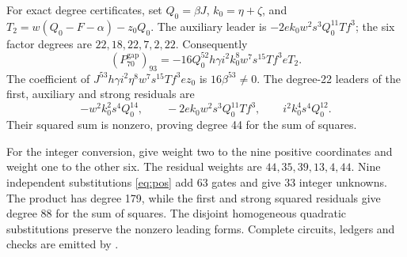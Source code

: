For exact degree certificates, set \(Q_0=\beta J\),
\(k_0=\eta+\zeta\), and
\(T_2=w(Q_0-F-\alpha)-z_0Q_0\). The auxiliary leader is
\(-2ek_0w^2s^3Q_0^{11}Tf^3\); the six factor degrees are
\(22,18,22,7,2,22\). Consequently
\begin{equation}
 (P_{70}^{\mathrm{gap}})_{93}
  =-16Q_0^{52}h\gamma i^2k_0^8w^7s^{15}Tf^3eT_2.
 \label{eq:gap-product-leader}
\end{equation}
The coefficient of
\(J^{53}h\gamma i^2\eta^8w^7s^{15}Tf^3ez_0\)
is \(16\beta^{53}\ne0\). The degree-22 leaders of the first,
auxiliary and strong residuals are
\[
 -w^2k_0^2s^4Q_0^{14},\qquad
 -2ek_0w^2s^3Q_0^{11}Tf^3,\qquad
 i^2k_0^4s^4Q_0^{12}.
\]
Their squared sum is nonzero, proving degree 44 for the sum of squares.

For the integer conversion, give weight two to the nine positive
coordinates and weight one to the other six. The residual weights are
\(44,35,39,13,4,44\). Nine independent substitutions
\eqref{eq:pos} add 63 gates and give 33 integer unknowns. The product
has degree 179, while the first and strong squared residuals give
degree 88 for the sum of squares. The disjoint homogeneous quadratic
substitutions preserve the nonzero leading forms. Complete circuits,
ledgers and checks are emitted by .
